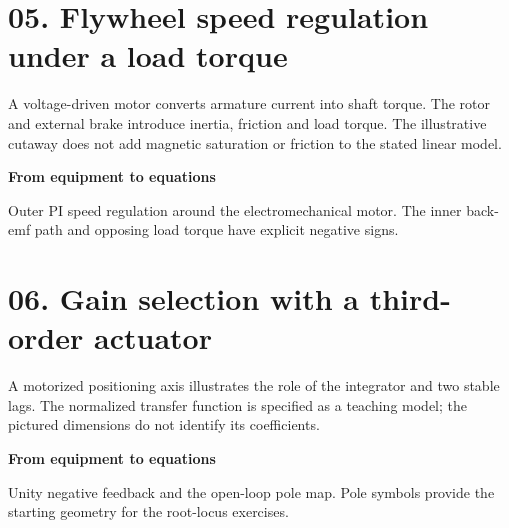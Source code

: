 \documentclass[10pt,a4paper]{article}
\begin{document}
\newpage
\section*{05. Flywheel speed regulation under a load torque}
\begin{center}\resizebox{.88\linewidth}{!}{}\par{\small A voltage-driven motor converts armature current into shaft torque. The rotor and external brake introduce inertia, friction and load torque. The illustrative cutaway does not add magnetic saturation or friction to the stated linear model.}\end{center}
\medskip\textbf{From equipment to equations}\par
\begin{center}\resizebox{\ifdim\width>.98\linewidth.98\linewidth\else\width\fi}{!}{}\par{\small Outer PI speed regulation around the electromechanical motor. The inner back-emf path and opposing load torque have explicit negative signs.}\end{center}

\newpage
\section*{06. Gain selection with a third-order actuator}
\begin{center}\resizebox{.88\linewidth}{!}{}\par{\small A motorized positioning axis illustrates the role of the integrator and two stable lags. The normalized transfer function is specified as a teaching model; the pictured dimensions do not identify its coefficients.}\end{center}
\medskip\textbf{From equipment to equations}\par
\begin{center}\resizebox{\ifdim\width>.98\linewidth.98\linewidth\else\width\fi}{!}{}\par{\small Unity negative feedback and the open-loop pole map. Pole symbols provide the starting geometry for the root-locus exercises.}\end{center}

\newpage
\end{document}
